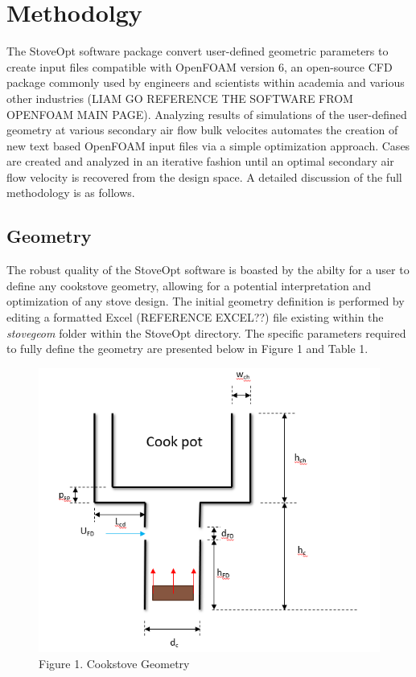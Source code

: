 \documentclass[3p,times,twocolumn]{elsarticle}
\begin{document}
\section{Methodolgy}
The StoveOpt software package convert user-defined geometric parameters to create input files compatible with OpenFOAM version 6, an open-source CFD package commonly used by engineers and scientists within academia and various other industries (LIAM GO REFERENCE THE SOFTWARE FROM OPENFOAM MAIN PAGE). Analyzing results of simulations of the user-defined geometry at various secondary air flow bulk velocites automates the creation of new text based OpenFOAM input files via a simple optimization approach. Cases are created and analyzed in an iterative fashion until an optimal secondary air flow velocity is recovered from the design space. A detailed discussion of the full methodology is as follows.   

\subsection{Geometry}
The robust quality of the StoveOpt software is boasted by the abilty for a user to define any cookstove geometry, allowing for a potential interpretation and optimization of any stove design. The initial geometry definition is performed by editing a formatted Excel (REFERENCE EXCEL??) file existing within the \textit{stovegeom} folder within the StoveOpt directory. The specific parameters required to fully define the geometry are presented below in Figure 1 and Table 1.

\begin{figure}{\linewidth}
	\includegraphics[width=\linewidth]{geometryfrompres.PNG}
	\centering
	\caption{Figure 1. Cookstove Geometry}
\end{figure}
\end{document}
